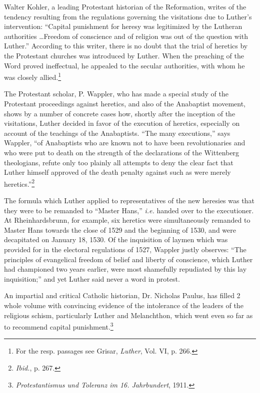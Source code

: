 Walter Kohler, a leading Protestant historian of the Reformation, writes of
the tendency resulting from the regulations governing the visitations due to
Luther’s intervention: “Capital punishment for heresy was legitimized by
the Lutheran authorities \dots Freedom of conscience and of religion was
out of the question with Luther.” According to this writer, there is no doubt
that the trial of heretics by the Protestant churches was introduced by
Luther. When the preaching of the Word proved ineffectual, he appealed
to the secular authorities, with whom he was closely allied.\footnote
{For the resp. passages see Grisar, \textit{Luther}, Vol. VI, p. 266.}

The Protestant scholar, P. Wappler, who has made a special study
of the Protestant proceedings against heretics, and also of the Anabaptist
movement, shows by a number of concrete cases how, shortly after
the inception of the visitations, Luther decided in favor of the execution of
heretics, especially on account of the teachings of the Anabaptists. “The many
executions,” says Wappler, “of Anabaptists who are known not to have
been revolutionaries and who were put to death on the strength of the
declarations of the Wittenberg theologians, refute only too plainly all
attempts to deny the clear fact that Luther himself approved of the death
penalty against such as were merely heretics.”\footnote{\textit{Ibid.}, p. 267.}

The formula which Luther applied to representatives of the new
heresies was that they were to be remanded to “Master Hans,” \textit{i.e.}
handed over to the executioner. At Rheinhardsbrunn, for example,
six heretics were simultaneously remanded to Master Hans towards
the close of 1529 and the beginning of 1530, and were decapitated on
January 18, 1530. Of the inquisition of laymen which was provided
for in the electoral regulations of 1527, Wappler justly observes:
“The principles of evangelical freedom of belief and liberty of conscience,
which Luther had championed two years earlier, were most
shamefully repudiated by this lay inquisition;” and yet Luther said
never a word in protest.

An impartial and critical Catholic historian, Dr. Nicholas Paulus,
has filled 2 whole volume with convincing evidence of the intolerance
of the leaders of the religious schism, particularly Luther and Melanchthon,
which went even so far as to recommend capital punishment.\footnote{\textit{Protestantismus und Toleranz im 16. Jahrbundert}, 1911.}

